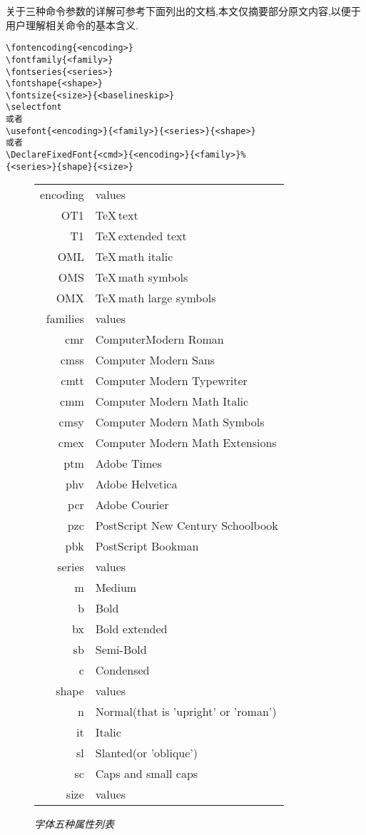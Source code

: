 \documentclass{zhart}
\begin{document}
关于三种命令参数的详解可参考下面列出的文档,本文仅摘要部分原文内容,以便于用户理解相关命令的基本含义.
\begin{verbatim}
\fontencoding{<encoding>}
\fontfamily{<family>}
\fontseries{<series>}
\fontshape{<shape>}
\fontsize{<size>}{<baselineskip>}
\selectfont
或者
\usefont{<encoding>}{<family>}{<series>}{<shape>}
或者
\DeclareFixedFont{<cmd>}{<encoding>}{<family>}%
{<series>}{shape}{<size>}
\end{verbatim}
\begin{figure}[H]
\centering
\caption*{\textit{字体五种属性列表}}
\begin{tabular}{rl}
\hline
encoding&values\\
OT1&\TeX\,text\\
T1&\TeX\,extended text\\
OML&\TeX\,math italic\\
OMS&\TeX\,math symbols\\
OMX&\TeX\,math large symbols\\
\hline
families&values\\
\hline
cmr&ComputerModern Roman\\
cmss&Computer Modern Sans\\
cmtt&Computer Modern Typewriter\\
cmm&Computer Modern Math Italic\\
cmsy&Computer Modern Math Symbols\\
cmex&Computer Modern Math Extensions\\
ptm&Adobe Times\\
phv&Adobe Helvetica\\
pcr&Adobe Courier\\
pzc&PostScript New Century Schoolbook\\
pbk&PostScript Bookman\\
\hline
series&values\\
\hline
m&Medium\\
b&Bold\\
bx&Bold extended\\
sb&Semi-Bold\\
c&Condensed\\
\hline
shape&values\\
\hline
n&Normal(that is 'upright' or 'roman')\\
it&Italic\\
sl&Slanted(or 'oblique')\\
sc&Caps and small caps\\
\hline
size&values\\

\end{tabular}
\end{figure}
\end{document}
